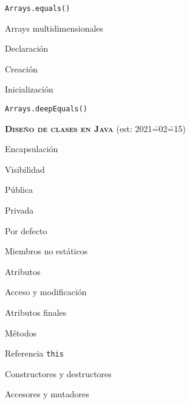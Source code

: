 \begin{longenum}
\begin{longenum}
\begin{longenum}
\begin{longenum}
\begin{longenum}
                    \item \texttt{Arrays.equals()}
                \end{longenum}
                \item Arrays multidimensionales
                \begin{longenum}
                    \item Declaración
                    \item Creación
                    \item Inicialización
                    \item \texttt{Arrays.deepEquals()} 
                \end{longenum}
            \end{longenum}
        \end{longenum}
    \end{longenum}
    \item \textbf{\textsc{Diseño de clases en Java}} (est: 2021\==02\==15)
    \begin{longenum}
        \item Encapsulación
        \begin{longenum}
            \item Visibilidad
            \begin{longenum}
                \item Pública
                \item Privada
                \item Por defecto
            \end{longenum}
        \end{longenum}
        \item Miembros no estáticos
        \begin{longenum}
            \item Atributos
            \begin{longenum}
                \item Acceso y modificación
                \item Atributos finales
            \end{longenum}
            \item Métodos
            \begin{longenum}
                \item Referencia \texttt{this}
                \item Constructores y destructores
                \item Accesores y mutadores

\end{longenum}
\end{longenum}
\end{longenum}
\end{longenum}
